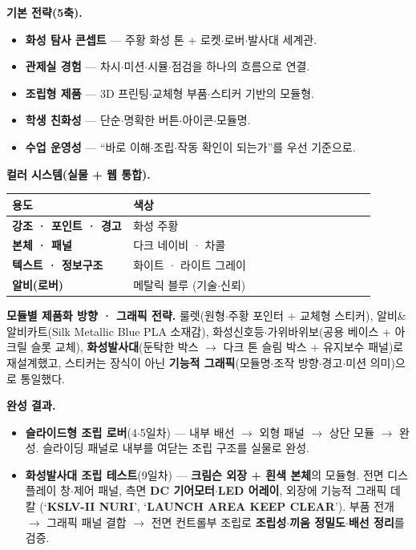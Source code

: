\smallskip
\noindent\textbf{기본 전략(5축).}
\begin{itemize}
  \item \textbf{화성 탐사 콘셉트} --- 주황 화성 톤 + 로켓$\cdot$로버$\cdot$발사대 세계관.
  \item \textbf{관제실 경험} --- 차시$\cdot$미션$\cdot$시뮬$\cdot$점검을 하나의 흐름으로 연결.
  \item \textbf{조립형 제품} --- 3D 프린팅$\cdot$교체형 부품$\cdot$스티커 기반의 모듈형.
  \item \textbf{학생 친화성} --- 단순$\cdot$명확한 버튼$\cdot$아이콘$\cdot$모듈명.
  \item \textbf{수업 운영성} --- ``바로 이해$\cdot$조립$\cdot$작동 확인이 되는가''를 우선 기준으로.
\end{itemize}

\smallskip
\noindent\textbf{컬러 시스템(실물 + 웹 통합).}
\begin{center}
\renewcommand{\arraystretch}{1.25}
\begin{tabularx}{\linewidth}{@{}>{\sffamily\bfseries}L{0.30\linewidth} L{0.60\linewidth}@{}}
\toprule
용도 & 색상 \\
\midrule
강조 · 포인트 · 경고 & 화성 주황  \\
본체 · 패널 & 다크 네이비  · 차콜  \\
텍스트 · 정보구조 & 화이트  · 라이트 그레이  \\
알비(로버) & 메탈릭 블루 (기술$\cdot$신뢰) \\
\bottomrule
\end{tabularx}
\end{center}

\smallskip
\noindent\textbf{모듈별 제품화 방향 · 그래픽 전략.} 룰렛(원형$\cdot$주황 포인터 + 교체형 스티커),
알비\&알비카트(Silk Metallic Blue PLA 소재감), 화성신호등$\cdot$가위바위보(공용 베이스 + 아크릴
슬롯 교체), \textbf{화성발사대}(둔탁한 박스 $\to$ 다크 톤 슬림 박스 + 유지보수 패널)로 재설계했고,
스티커는 장식이 아닌 \textbf{기능적 그래픽}(모듈명$\cdot$조작 방향$\cdot$경고$\cdot$미션 의미)으로 통일했다.

\smallskip
\noindent\textbf{완성 결과.}
\begin{itemize}
  \item \textbf{슬라이드형 조립 로버}(4$\cdot$5일차) --- 내부 배선 $\to$ 외형 패널 $\to$ 상단 모듈 $\to$
  완성. 슬라이딩 패널로 내부를 여닫는 조립 구조를 실물로 완성.
  \item \textbf{화성발사대 조립 테스트}(9일차) --- \textbf{크림슨 외장 + 흰색 본체}의 모듈형. 전면
  디스플레이 창$\cdot$제어 패널, 측면 \textbf{DC 기어모터$\cdot$LED 어레이}, 외장에 기능적 그래픽 데칼
  (`\textbf{KSLV-II NURI}', `\textbf{LAUNCH AREA KEEP CLEAR}'). 부품 전개 $\to$ 그래픽 패널 결합
  $\to$ 전면 컨트롤부 조립로 \textbf{조립성$\cdot$끼움 정밀도$\cdot$배선 정리}를 검증.
\end{itemize}

